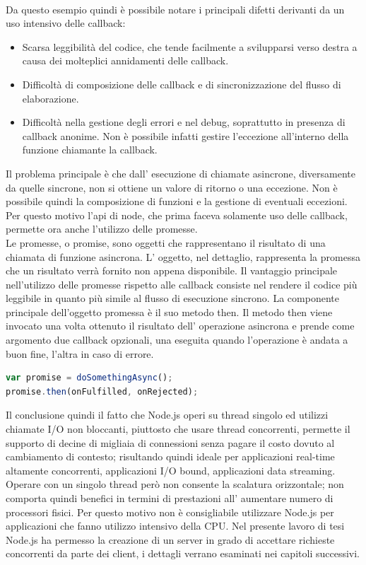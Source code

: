 \\
Da questo esempio quindi è possibile notare i principali difetti derivanti da un uso intensivo delle callback:
\begin{itemize}
\item Scarsa leggibilità del codice, che tende facilmente a svilupparsi verso destra a causa dei molteplici annidamenti delle callback.
\item Difficoltà di composizione delle callback e di sincronizzazione del flusso di elaborazione.
\item Difficoltà nella gestione degli errori e nel debug, soprattutto in presenza di callback anonime. Non è possibile infatti gestire l’eccezione all’interno della funzione chiamante la callback.
\end{itemize}
Il problema principale è che dall’ esecuzione di chiamate asincrone, diversamente da quelle sincrone, non si ottiene un valore di ritorno o una eccezione. Non è possibile quindi la composizione di funzioni e la gestione di eventuali eccezioni.
Per questo motivo l’api di node, che prima faceva solamente uso delle callback, permette ora anche l’utilizzo delle promesse.
\\
Le promesse, o promise, sono oggetti che rappresentano il risultato di una chiamata di funzione asincrona. L’ oggetto, nel dettaglio, rappresenta la promessa che un risultato verrà fornito non appena disponibile.
Il vantaggio principale nell’utilizzo delle promesse rispetto alle callback consiste nel rendere il codice più leggibile in quanto più simile al flusso di esecuzione sincrono.
La componente principale dell’oggetto promessa è il suo metodo then. 
Il metodo then viene invocato una volta ottenuto il risultato dell’ operazione asincrona e prende come argomento due callback opzionali, una eseguita quando l’operazione è andata a buon fine, l’altra in caso di errore.
\begin{lstlisting}[language=javascript]
var promise = doSomethingAsync();
promise.then(onFulfilled, onRejected);
\end{lstlisting}
Il conclusione quindi il fatto che Node.js operi su thread singolo ed utilizzi chiamate I/O non bloccanti, piuttosto che usare thread concorrenti, permette il supporto di decine di migliaia di connessioni senza pagare il costo dovuto al cambiamento di contesto; risultando quindi ideale per applicazioni real-time altamente concorrenti, applicazioni I/O bound, applicazioni data streaming. 
\\
Operare con un singolo thread però non consente la scalatura orizzontale; non comporta quindi benefici in termini di prestazioni all’ aumentare numero di processori fisici. 
Per questo motivo non è consigliabile utilizzare Node.js per applicazioni che fanno utilizzo intensivo della CPU.
Nel presente lavoro di tesi Node.js ha permesso la creazione di un server in grado di accettare richieste concorrenti da parte dei client, i dettagli verrano esaminati nei capitoli successivi.

